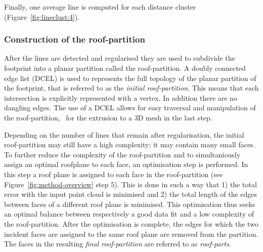 Finally, one average line is computed for each distance cluster (Figure~\ref{fig:lineclust:4}).

\subsubsection{Construction of the roof-partition}
After the lines are detected and regularised they are used to subdivide the footprint into a planar partition called the roof-partition.
A doubly connected edge list (DCEL) is used to represents the full topology of the planar partition of the footprint, that is referred to as the \emph{initial roof-partition}.
This means that each intersection is explicitly represented with a vertex.
In addition there are no dangling edges.
The use of a DCEL allows for easy traversal and manipulation of the roof-partition, \eg\ for the extrusion to a 3D mesh in the last step.


Depending on the number of lines that remain after regularisation, the initial roof-partition may still have a high complexity; it may contain many small faces.
To further reduce the complexity of the roof-partition and to simultaniously assign an optimal roofplane to each face, an optimisation step is performed.
In this step a roof plane is assigned to each face in the roof-partition (see Figure~\ref{fig:method-overview} step 5).
This is done in such a way that 1) the total error with the input point cloud is minimised and 2) the total length of the edges between faces of a different roof plane is minimised.
This  optimisation thus seeks an optimal balance between respectively a good data fit and a low complexity of the roof-partition.
After the optimisation is complete, the edges for which the two incident faces are assigned to the same roof plane are removed from the partition.
The faces in the resulting \emph{final roof-partition} are referred to as \emph{roof-parts}.

